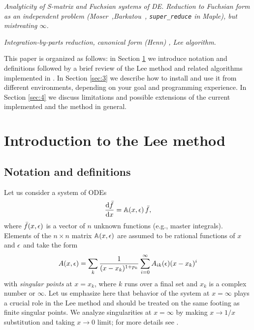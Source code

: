 \documentclass[12pt,a4paper]{article}
\def\M#1{\mathbb{#1}} %
\begin{document}
{\it Analyticity of S-matrix and Fuchsian systems of DE. Reduction to Fuchsian form as an independent problem (Moser~\cite{Mos59},Barkatou~\cite{BP09}, \texttt{super\_reduce} in Maple), but mistreating $\infty$.}

{\it Integration-by-parts reduction, canonical form (Henn) \cite{Henn13}, Lee algorithm.}

This paper is organized as follows: in Section \ref{sec:2} we introduce notation and definitions followed by a brief review of the Lee method \cite{Lee15} and related algorithms implemented in \fuchsia.
In Section \ref{sec:3} we describe how to install \fuchsia and use it from different environments, depending on your goal and programming experience.
In Section \ref{sec:4} we discuss limitations and possible extensions of the current implemented and the method in general.


\section{Introduction to the Lee method}
\label{sec:2}


\subsection{Notation and definitions}

Let us consider a system of ODEs
\begin{equation}
\label{eq:df}
  \frac{\D \bar{f}}{\D x} = \M A(x,\eps)\,\bar{f},
\end{equation}
where $\bar{f}(x,\epsilon)$ is a vector of $n$ unknown functions (e.g., master integrals).
Elements of the $n \times n$ matrix  $\M A(x,\eps)$ are assumed to be rational functions of $x$ and $\epsilon$ and take the form
\begin{equation}
\label{eq:axeps}
  A(x,\epsilon) = \sum_k \frac{1}{(x-x_k)^{1+p_k}} \sum_{i=0}^\infty A_{ik}(\epsilon) (x-x_k)^i
\end{equation}
with {\em singular points} at $x = x_k$, where $k$ runs over a final set and $x_k$ is a complex number or $\infty$.
Let us emphasize here that behavior of the system at $x=\infty$ plays a crucial role in the Lee method and should be treated on the same footing as finite singular points.
We analyze singularities at $x=\infty$ by making $x\to1/x$ substitution and taking $x\to0$ limit; for more details see \cite{Bal08}.
\end{document}
